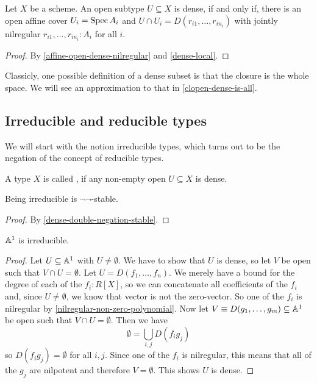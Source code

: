 \begin{theorem}%
  \label{dense-is-jointly-nilregular}
  Let $X$ be a scheme.
  An open subtype $U\subseteq X$ is dense,
  if and only if, there is an open affine cover $U_i=\operatorname{Spec} A_i$
  and $U\cap U_i=D(r_{i1},\dots,r_{in_i})$ with jointly nilregular $r_{i1},\dots,r_{in_i}:A_i$ for all $i$.
\end{theorem}

\begin{proof}
  By \cref{affine-open-dense-nilregular} and \cref{dense-local}.
\end{proof}

Classicly, one possible definition of a dense subset
is that the closure is the whole space.
We will see an approximation to that in \cref{clopen-dense-is-all}.

\subsection{Irreducible and reducible types}

We will start with the notion irreducible types,
which turns out to be the negation of the concept of reducible types.

\begin{definition}%
  \label{irred}
  A type $X$ is called ,
  if any non-empty open $U\subseteq X$ is dense.
\end{definition}

\begin{proposition}%
  \label{irred-double-negation-stable}
  Being irreducible is $\neg\neg$-stable.
\end{proposition}

\begin{proof}
  By \cref{dense-double-negation-stable}.  
\end{proof}

\begin{proposition}%
  $\mathbb{A}^1$ is irreducible.
\end{proposition}

\begin{proof}
  Let $U\subseteq \mathbb{A}^1$ with $U\neq \emptyset$.
  We have to show that $U$ is dense, so let $V$ be open such that $V\cap U=\emptyset$.
  Let $U=D(f_1,\dots,f_n)$.
  We merely have a bound for the degree of each of the $f_i:R[X]$,
  so we can concatenate all coefficients of the $f_i$ and, since $U\neq \emptyset$,
  we know that vector is not the zero-vector.
  So one of the $f_i$ is nilregular by \cref{nilregular-non-zero-polynomial}.
  Now let $V\equiv D(g_1,\dots,g_m)\subseteq \mathbb{A}^1$ be open such that $V\cap U=\emptyset$.
  Then we have
  \[ \emptyset=\bigcup_{i,j} D(f_ig_j) \]
  so $D(f_ig_j)=\emptyset$ for all $i,j$.
  Since one of the $f_i$ is nilregular,
  this means that all of the $g_j$ are nilpotent and therefore $V=\emptyset$.
  This shows $U$ is dense.
\end{proof}

